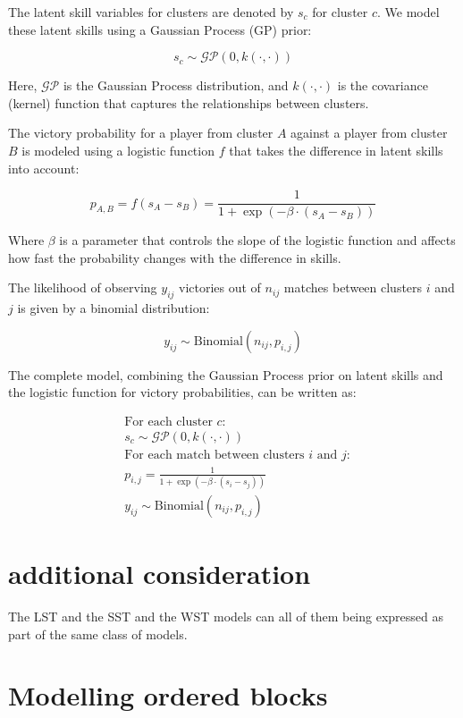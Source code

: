 \documentclass[11pt]{amsart}
\begin{document}
The latent skill variables for clusters are denoted by $s_c$ for cluster $c$. We model these latent skills using a Gaussian Process (GP) prior:

\[
s_c \sim \mathcal{GP}(0, k(\cdot, \cdot))
\]

Here, $\mathcal{GP}$ is the Gaussian Process distribution, and $k(\cdot, \cdot)$ is the covariance (kernel) function that captures the relationships between clusters.

The victory probability for a player from cluster $A$ against a player from cluster $B$ is modeled using a logistic function $f$ that takes the difference in latent skills into account:

\[
p_{A,B} = f(s_A - s_B) = \frac{1}{1 + \exp(-\beta \cdot (s_A - s_B))}
\]

Where $\beta$ is a parameter that controls the slope of the logistic function and affects how fast the probability changes with the difference in skills.

The likelihood of observing $y_{ij}$ victories out of $n_{ij}$ matches between clusters $i$ and $j$ is given by a binomial distribution:

\[
y_{ij} \sim \text{Binomial}(n_{ij}, p_{i,j})
\]

The complete model, combining the Gaussian Process prior on latent skills and the logistic function for victory probabilities, can be written as:

\begin{align*}
&\text{For each cluster } c: \\
&s_c \sim \mathcal{GP}(0, k(\cdot, \cdot)) \\
&\text{For each match between clusters } i \text{ and } j: \\
&p_{i,j} = \frac{1}{1 + \exp(-\beta \cdot (s_i - s_j))} \\
&y_{ij} \sim \text{Binomial}(n_{ij}, p_{i,j})
\end{align*}



\section{additional consideration}
The LST and the SST and the WST models can all of them being expressed as part of the same class of models.





\section{Modelling ordered blocks}
\end{document}
